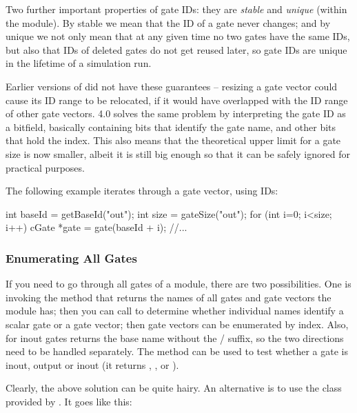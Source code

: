 Two further important properties of gate IDs: they are \textit{stable}
and \textit{unique} (within the module). By stable we mean that the ID
of a gate never changes; and by unique we not only mean that at any
given time no two gates have the same IDs, but also that IDs of deleted
gates do not get reused later, so gate IDs are unique in the lifetime
of a simulation run.

\begin{note}
    Earlier versions of {\opp} did not have these guarantees -- resizing
    a gate vector could cause its ID range to be relocated, if it
    would have overlapped with the ID range of other gate vectors.
    {\opp} 4.0 solves the same problem by interpreting the gate ID
    as a bitfield, basically containing bits that identify the gate name,
    and other bits that hold the index. This also means that the theoretical
    upper limit for a gate size is now smaller, albeit it is still
    big enough so that it can be safely ignored for practical purposes.
\end{note}

The following example iterates through a gate vector, using IDs:

\begin{cpp}
int baseId = getBaseId("out");
int size = gateSize("out");
for (int i=0; i<size; i++) {
    cGate *gate = gate(baseId + i);
    //...
}
\end{cpp}


\subsubsection{Enumerating All Gates}

If you need to go through all gates of a module, there are
two possibilities. One is invoking the  method
that returns the names of all gates and gate vectors the module
has; then you can call  to determine
whether individual names identify a scalar gate or a gate vector;
then gate vectors can be enumerated by index. Also, for inout
gates  returns the base name without the
/ suffix, so the two directions
need to be handled separately. The  method
can be used to test whether a gate is inout, output or inout
(it returns , , or
).

Clearly, the above solution can be quite hairy. An alternative is to use
the  class provided by .
It goes like this:

